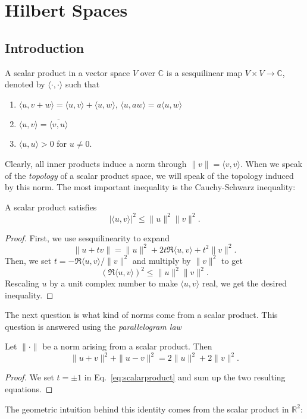 \documentclass[twoside,symmetric, openany, 12pt]{./tuftebook}
\theoremstyle{definition}
\theoremstyle{definition}
\theoremstyle{definition}
\newenvironment{parts}{\begin{enumerate}[label=(\alph*)]}{\end{enumerate}}
\newcommand{\R}{\mathbb{R}}
\newcommand{\C}{\mathbb{C}}
\begin{document}
\chapter{Hilbert Spaces}
\section{Introduction}
\begin{Definition}
	A scalar product in a vector space $V$ over $\C$ is a sesquilinear map $V\times V\to \C$, denoted by $\langle \cdot, \cdot \rangle$ such that
	\begin{parts}
		\item $\langle u, v+w\rangle =\langle u, v\rangle + \langle u, w\rangle$, $\langle u, aw\rangle = a\langle u, w\rangle$
		\item $\langle u, v\rangle = \overline{\langle v, u\rangle}$
		\item $\langle u, u\rangle>0$ for $u\neq 0$.
	\end{parts}
\end{Definition}
Clearly, all inner products induce a norm through $\|v\| = \langle v, v\rangle$. When we speak of the \emph{topology} of a scalar product space, we will speak of the topology induced by this norm. The most important inequality is the Cauchy-Schwarz inequality:
\begin{Theorem}
	A scalar product satisfies
	\[|\langle u, v \rangle|^2 \le \|u\|^2 \|v\|^2.\]
\end{Theorem}
\begin{proof}
	First, we use sesquilinearity to expand
	\begin{equation}
		\|u + tv\| = \|u\|^2 + 2t \Re\langle u, v\rangle +t^2 \|v\|^2.\label{eq:scalarproduct}
\end{equation}
	Then, we set $t=-\Re\langle u, v\rangle /\|v\|^2$ and multiply by $\|v\|^2$ to get
	\[(\Re\langle u,v\rangle)^2 \le \|u\|^2\|v\|^2.\]
	Rescaling $u$ by a unit complex number to make $\langle u, v\rangle$ real, we get the desired inequality.
\end{proof}
The next question is what kind of norms come from a scalar product. This question is answered using the \emph{parallelogram law}
\begin{Proposition}
	Let $\|\cdot\|$ be a norm arising from a scalar product. Then
	\[
	\|u+v\|^2 + \|u-v\|^2 = 2\|u\|^2 + 2\|v\|^2
	.\] 
\end{Proposition}
\begin{proof}
	We set $t=\pm 1$ in Eq.~\eqref{eq:scalarproduct} and sum up the two resulting equations.
\end{proof}
The geometric intuition behind this identity comes from the scalar product in $\R^2$:
\end{document}
